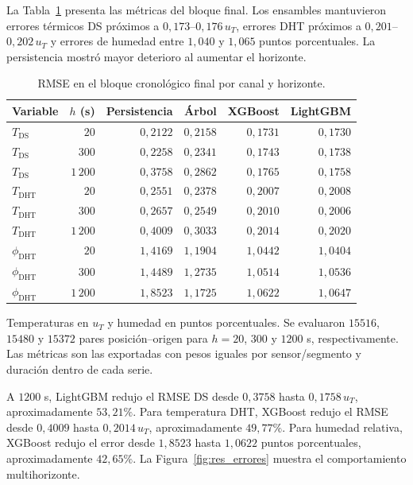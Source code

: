 La Tabla~\ref{tab:res_rmse} presenta las métricas del bloque final. Los ensambles mantuvieron errores térmicos DS próximos a $0{,}173$--$0{,}176\,u_T$, errores DHT próximos a $0{,}201$--$0{,}202\,u_T$ y errores de humedad entre $1{,}040$ y $1{,}065$ puntos porcentuales. La persistencia mostró mayor deterioro al aumentar el horizonte.

\begin{table}[htbp]
\centering
\caption{RMSE en el bloque cronológico final por canal y horizonte.}
\label{tab:res_rmse}
\small
\setlength{\tabcolsep}{5pt}
\begin{tabular}{lrrrrr}
\toprule
Variable & $h$ (s) & Persistencia & Árbol & XGBoost & LightGBM \\
\midrule
$T_{\mathrm{DS}}$ & $20$ & $0{,}2122$ & $0{,}2158$ & $0{,}1731$ & $0{,}1730$ \\
$T_{\mathrm{DS}}$ & $300$ & $0{,}2258$ & $0{,}2341$ & $0{,}1743$ & $0{,}1738$ \\
$T_{\mathrm{DS}}$ & $1\,200$ & $0{,}3758$ & $0{,}2862$ & $0{,}1765$ & $0{,}1758$ \\
$T_{\mathrm{DHT}}$ & $20$ & $0{,}2551$ & $0{,}2378$ & $0{,}2007$ & $0{,}2008$ \\
$T_{\mathrm{DHT}}$ & $300$ & $0{,}2657$ & $0{,}2549$ & $0{,}2010$ & $0{,}2006$ \\
$T_{\mathrm{DHT}}$ & $1\,200$ & $0{,}4009$ & $0{,}3033$ & $0{,}2014$ & $0{,}2020$ \\
$\phi_{\mathrm{DHT}}$ & $20$ & $1{,}4169$ & $1{,}1904$ & $1{,}0442$ & $1{,}0404$ \\
$\phi_{\mathrm{DHT}}$ & $300$ & $1{,}4489$ & $1{,}2735$ & $1{,}0514$ & $1{,}0536$ \\
$\phi_{\mathrm{DHT}}$ & $1\,200$ & $1{,}8523$ & $1{,}1725$ & $1{,}0622$ & $1{,}0647$ \\
\bottomrule
\end{tabular}
\par\vspace{3pt}
\begin{minipage}{0.98\textwidth}\footnotesize
Temperaturas en $u_T$ y humedad en puntos porcentuales. Se evaluaron $15516$, $15480$ y $15372$ pares posición--origen para $h=20$, $300$ y $1200$ s, respectivamente. Las métricas son las exportadas con pesos iguales por sensor/segmento y duración dentro de cada serie.
\end{minipage}
\end{table}


A $1200$ s, LightGBM redujo el RMSE DS desde $0{,}3758$ hasta $0{,}1758\,u_T$, aproximadamente $53{,}21\%$. Para temperatura DHT, XGBoost redujo el RMSE desde $0{,}4009$ hasta $0{,}2014\,u_T$, aproximadamente $49{,}77\%$. Para humedad relativa, XGBoost redujo el error desde $1{,}8523$ hasta $1{,}0622$ puntos porcentuales, aproximadamente $42{,}65\%$. La Figura~\ref{fig:res_errores} muestra el comportamiento multihorizonte.


